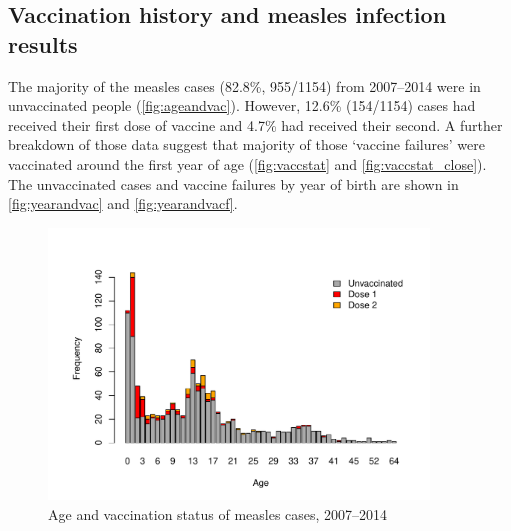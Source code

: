 \documentclass{article}
\begin{document}
\subsection{Vaccination history and measles infection results}

The majority of the measles cases (82.8\%, 955/1154) from 2007--2014 were in unvaccinated people (\autoref{fig:ageandvac}). However, 12.6\% (154/1154) cases had received their first dose of vaccine and 4.7\% had received their second. A further breakdown of those data suggest that majority of those `vaccine failures' were vaccinated around the first year of age (\autoref{fig:vaccstat} and \autoref{fig:vaccstat_close}). The unvaccinated cases and vaccine failures by year of birth are shown in \autoref{fig:yearandvac} and \autoref{fig:yearandvacf}.

\begin{figure}
\begin{center}
     \includegraphics[width=0.9\textwidth]{vacc_status.pdf}
\end{center}
\caption{Age and vaccination status of measles cases, 2007--2014}
\label{fig:ageandvac}
\end{figure}
\end{document}
